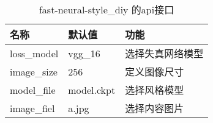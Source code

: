 \begin{table}[H]
\centering
\begin{tabular}{lll}
\toprule
  名称&默认值&功能\\
\midrule
  loss\_model&vgg\_16&选择失真网络模型\\
  image\_size&256&定义图像尺寸\\
  model\_file&model.ckpt&选择风格模型\\
  image\_fiel&a.jpg&选择内容图片\\
\bottomrule
\end{tabular}
\caption{fast-neural-style\_diy 的api接口}
\label{tbl-abi-neural-style}
\end{table}
